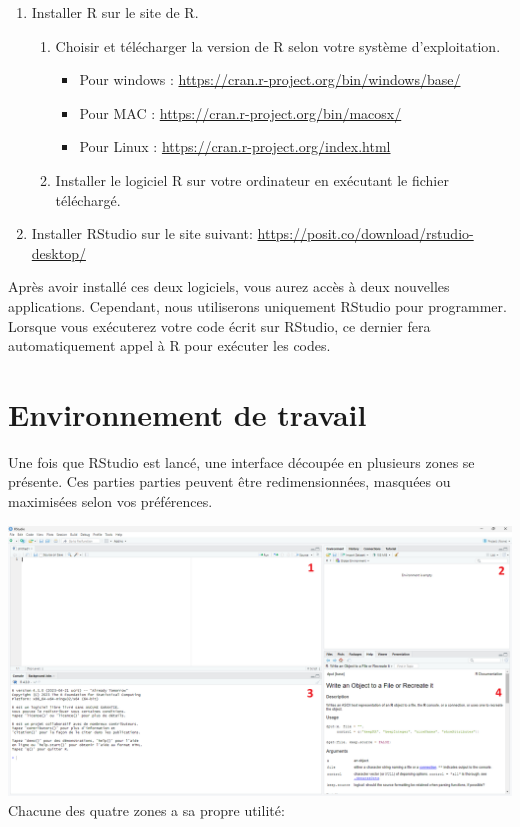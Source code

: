 \documentclass[
]{book}
\providecommand{\tightlist}{%
  \setlength{\itemsep}{0pt}\setlength{\parskip}{0pt}}
\begin{document}
\begin{enumerate}
\def\labelenumi{\arabic{enumi}.}
\tightlist
\item
  Installer R sur le site de R.

  \begin{enumerate}
  \def\labelenumii{\roman{enumii}.}
  \tightlist
  \item
    Choisir et télécharger la version de R selon votre système d'exploitation.

    \begin{itemize}
    \tightlist
    \item
      Pour windows : \url{https://cran.r-project.org/bin/windows/base/}
    \item
      Pour MAC : \url{https://cran.r-project.org/bin/macosx/}
    \item
      Pour Linux : \url{https://cran.r-project.org/index.html}
    \end{itemize}
  \item
    Installer le logiciel R sur votre ordinateur en exécutant le fichier téléchargé.
  \end{enumerate}
\item
  Installer RStudio sur le site suivant: \url{https://posit.co/download/rstudio-desktop/}
\end{enumerate}

Après avoir installé ces deux logiciels, vous aurez accès à deux nouvelles applications. Cependant, nous utiliserons uniquement RStudio pour programmer. Lorsque vous exécuterez votre code écrit sur RStudio, ce dernier fera automatiquement appel à R pour exécuter les codes.

\section{Environnement de travail}\label{environnement-de-travail}

Une fois que RStudio est lancé, une interface découpée en plusieurs zones se présente. Ces parties parties peuvent être redimensionnées, masquées ou maximisées selon vos préférences.

\includegraphics{images/environnement.png}
Chacune des quatre zones a sa propre utilité:
\end{document}
